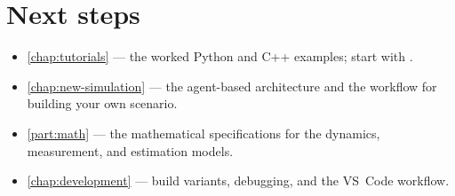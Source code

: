\section{Next steps}
\label{sec:gs-next}

\begin{itemize}[leftmargin=*]
  \item \cref{chap:tutorials} --- the worked Python and C++ examples; start
    with .
  \item \cref{chap:new-simulation} --- the agent-based architecture and the
    workflow for building your own scenario.
  \item \cref{part:math} --- the mathematical specifications for the dynamics,
    measurement, and estimation models.
  \item \cref{chap:development} --- build variants, debugging, and the VS~Code
    workflow.
\end{itemize}
